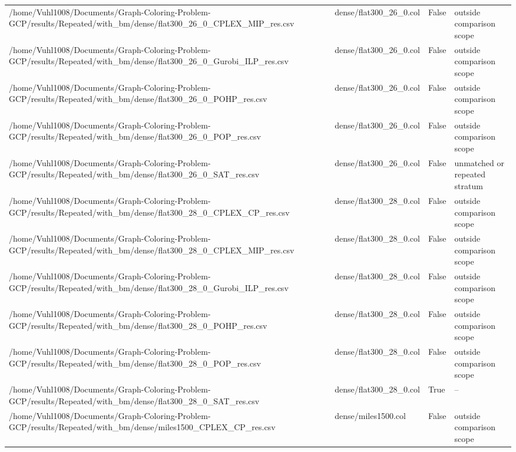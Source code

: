 \begin{table}[htbp]
\begin{tabular}{llll}
/home/Vuhl1008/Documents/Graph-Coloring-Problem-GCP/results/Repeated/with\_bm/dense/flat300\_26\_0\_CPLEX\_MIP\_res.csv & dense/flat300\_26\_0.col & False & outside comparison scope \\
/home/Vuhl1008/Documents/Graph-Coloring-Problem-GCP/results/Repeated/with\_bm/dense/flat300\_26\_0\_Gurobi\_ILP\_res.csv & dense/flat300\_26\_0.col & False & outside comparison scope \\
/home/Vuhl1008/Documents/Graph-Coloring-Problem-GCP/results/Repeated/with\_bm/dense/flat300\_26\_0\_POHP\_res.csv & dense/flat300\_26\_0.col & False & outside comparison scope \\
/home/Vuhl1008/Documents/Graph-Coloring-Problem-GCP/results/Repeated/with\_bm/dense/flat300\_26\_0\_POP\_res.csv & dense/flat300\_26\_0.col & False & outside comparison scope \\
/home/Vuhl1008/Documents/Graph-Coloring-Problem-GCP/results/Repeated/with\_bm/dense/flat300\_26\_0\_SAT\_res.csv & dense/flat300\_26\_0.col & False & unmatched or repeated stratum \\
/home/Vuhl1008/Documents/Graph-Coloring-Problem-GCP/results/Repeated/with\_bm/dense/flat300\_28\_0\_CPLEX\_CP\_res.csv & dense/flat300\_28\_0.col & False & outside comparison scope \\
/home/Vuhl1008/Documents/Graph-Coloring-Problem-GCP/results/Repeated/with\_bm/dense/flat300\_28\_0\_CPLEX\_MIP\_res.csv & dense/flat300\_28\_0.col & False & outside comparison scope \\
/home/Vuhl1008/Documents/Graph-Coloring-Problem-GCP/results/Repeated/with\_bm/dense/flat300\_28\_0\_Gurobi\_ILP\_res.csv & dense/flat300\_28\_0.col & False & outside comparison scope \\
/home/Vuhl1008/Documents/Graph-Coloring-Problem-GCP/results/Repeated/with\_bm/dense/flat300\_28\_0\_POHP\_res.csv & dense/flat300\_28\_0.col & False & outside comparison scope \\
/home/Vuhl1008/Documents/Graph-Coloring-Problem-GCP/results/Repeated/with\_bm/dense/flat300\_28\_0\_POP\_res.csv & dense/flat300\_28\_0.col & False & outside comparison scope \\
/home/Vuhl1008/Documents/Graph-Coloring-Problem-GCP/results/Repeated/with\_bm/dense/flat300\_28\_0\_SAT\_res.csv & dense/flat300\_28\_0.col & True & -- \\
/home/Vuhl1008/Documents/Graph-Coloring-Problem-GCP/results/Repeated/with\_bm/dense/miles1500\_CPLEX\_CP\_res.csv & dense/miles1500.col & False & outside comparison scope \\

\end{tabular}
\end{table}
